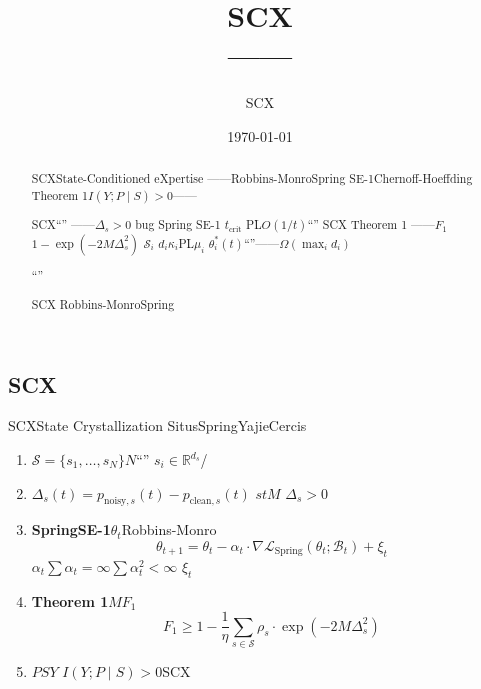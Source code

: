 \documentclass[11pt,a4paper]{article}
\title{\textbf{\LARGE SCX\\[6pt] ——}}
\author{SCX}\\
\date{\today}
\theoremstyle{remark}
\newcommand{\R}{\mathbb{R}}
\newcommand{\Sstates}{\mathcal{S}}
\begin{document}
\maketitle

\begin{abstract}
SCXState-Conditioned eXpertise
——Robbins-MonroSpring SE-1Chernoff-Hoeffding
Theorem 1$I(Y; P \mid S) > 0$——

SCX\textbf{}``''
——$\Delta_s > 0$
\textbf{}bug
\textbf{}Spring SE-1
$t_{\text{crit}}$
PL$O(1/t)$``''
\textbf{}SCX Theorem 1
——$F_1$
$1 - \exp(-2M\Delta_s^2)$
\textbf{}$\Sstates_i$
$d_i$$\kappa_i$PL$\mu_i$
$\theta_i^*(t)$``''——$\Omega(\max_i d_i)$


``''



\textbf{}SCX
Robbins-MonroSpring
\end{abstract}

\section{}

\subsection{SCX}

SCX\cite{scx2026theorems,scx2026cc_audit}State Crystallization
SitusSpringYajieCercis


\begin{enumerate}[label=(\arabic*)]
    \item \textbf{} $\Sstates = \{s_1, \ldots, s_N\}$$N$``''
          $s_i \in \R^{d_s}$/
    \item \textbf{} $\Delta_s(t) = p_{\text{noisy},s}(t) - p_{\text{clean},s}(t)$
          $s$$t$$M$
          $\Delta_s > 0$
    \item \textbf{SpringSE-1}$\theta_t$Robbins-Monro
          \begin{equation}
              \theta_{t+1} = \theta_t - \alpha_t \cdot \nabla\mathcal{L}_{\text{Spring}}(\theta_t; \mathcal{B}_t) + \xi_t
          \end{equation}
          $\alpha_t$$\sum \alpha_t = \infty$$\sum \alpha_t^2 < \infty$
          $\xi_t$
    \item \textbf{Theorem 1}$M$$F_1$
          \begin{equation}
              F_1 \geq 1 - \frac{1}{\eta}\sum_{s \in \Sstates} \rho_s \cdot \exp(-2M\Delta_s^2)
          \end{equation}
    \item \textbf{}$P$$S$$Y$
          $I(Y; P \mid S) > 0$SCX
\end{enumerate}
\end{document}
